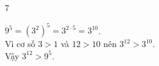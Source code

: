 \begin{Solbook}{7}
 \par \noindent  $9^{5}=(3^{2})^{5}=3^{2\cdot 5}=3^{10}$.\\ Vì cơ số $3>1$ và $12>10$ nên $3^{12}>3^{10}$.\\ Vậy $3^{12}>9^{5}$.  \hfill \qedEX 
\end{Solbook}
